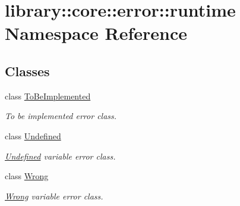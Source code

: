 \hypertarget{namespacelibrary_1_1core_1_1error_1_1runtime}{}\section{library\+:\+:core\+:\+:error\+:\+:runtime Namespace Reference}
\label{namespacelibrary_1_1core_1_1error_1_1runtime}
\subsection*{Classes}
\begin{DoxyCompactItemize}
\item 
class \hyperlink{classlibrary_1_1core_1_1error_1_1runtime_1_1_to_be_implemented}{To\+Be\+Implemented}
\begin{DoxyCompactList}\small\item\em To be implemented error class. \end{DoxyCompactList}\item 
class \hyperlink{classlibrary_1_1core_1_1error_1_1runtime_1_1_undefined}{Undefined}
\begin{DoxyCompactList}\small\item\em \hyperlink{classlibrary_1_1core_1_1error_1_1runtime_1_1_undefined}{Undefined} variable error class. \end{DoxyCompactList}\item 
class \hyperlink{classlibrary_1_1core_1_1error_1_1runtime_1_1_wrong}{Wrong}
\begin{DoxyCompactList}\small\item\em \hyperlink{classlibrary_1_1core_1_1error_1_1runtime_1_1_wrong}{Wrong} variable error class. \end{DoxyCompactList}\end{DoxyCompactItemize}
